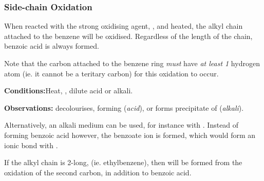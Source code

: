 
			\subsubsection{Side-chain Oxidation}

				When reacted with the strong oxidising agent, , and heated, the alkyl chain attached to the benzene will be oxidised.
				Regardless of the length of the chain, benzoic acid is always formed.

				Note that the carbon attached to the benzene ring \textit{must} have \textit{at least 1} hydrogen atom (ie. it cannot be a
				teritary carbon) for this oxidation to occur.

				\vspace{1.5em}

				\vbox{\textbf{Conditions:}\tabto{35mm}Heat, , dilute acid or alkali.}

				\vspace{0.75em}
				\vbox{\textbf{Observations:}\tabto{35mm}  decolourises, forming  (\textit{acid}), or
											\tabto{35mm}forms  precipitate of  (\textit{alkali}).}



				\pagebreak
				Alternatively, an alkali medium can be used, for instance with . Instead of forming benzoic acid however, the
				benzoate ion is formed, which would form an ionic bond with .





				If the alkyl chain is 2-long, (ie. ethylbenzene), then  will be formed from the oxidation of the second carbon,
				in addition to benzoic acid.


